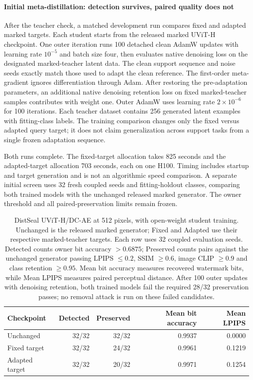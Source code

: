 \paragraph{Initial meta-distillation: detection survives, paired quality does not}
\label{sec:transport_training}
After the teacher check, a matched development run compares fixed and adapted marked targets. Each student starts from the released marked UViT-H checkpoint. One outer iteration runs 100 detached clean AdamW updates with learning rate $10^{-5}$ and batch size four, then evaluates native denoising loss on the designated marked-teacher latent data. The clean support sequence and noise seeds exactly match those used to adapt the clean reference. The first-order meta-gradient ignores differentiation through Adam. After restoring the pre-adaptation parameters, an additional native denoising retention loss on fixed marked-teacher samples contributes with weight one. Outer AdamW uses learning rate $2\times10^{-6}$ for 100 iterations. Each teacher dataset contains 256 generated latent examples with fitting-class labels. The training comparison changes only the fixed versus adapted query target; it does not claim generalization across support tasks from a single frozen adaptation sequence.

Both runs complete. The fixed-target allocation takes 825 seconds and the adapted-target allocation 703 seconds, each on one H100. Timing includes startup and target generation and is not an algorithmic speed comparison. A separate initial screen uses 32 fresh coupled seeds and fitting-holdout classes, comparing both trained models with the unchanged released marked generator. The owner threshold and all paired-preservation limits remain frozen.

\begin{table}[ht]\centering\small
\begin{tabular}{lrrrr}\toprule
Checkpoint & Detected & Preserved & Mean bit accuracy & Mean LPIPS\\\midrule
Unchanged & 32/32 & 32/32 & 0.9937 & 0.0000\\
Fixed target & 32/32 & 24/32 & 0.9961 & 0.1219\\
Adapted target & 32/32 & 20/32 & 0.9971 & 0.1254\\\bottomrule
\end{tabular}
\caption{DistSeal UViT-H/DC-AE at 512 pixels, with open-weight student training. Unchanged is the released marked generator; Fixed and Adapted use their respective marked-teacher targets. Each row uses 32 coupled evaluation seeds. Detected counts owner bit accuracy $>0.6875$; Preserved counts pairs against the unchanged generator passing LPIPS $\leq0.2$, SSIM $\geq0.6$, image CLIP $\geq0.9$ and class retention $\geq0.95$. Mean bit accuracy measures recovered watermark bits, while Mean LPIPS measures paired perceptual distance. After 100 outer updates with denoising retention, both trained models fail the required 28/32 preservation passes; no removal attack is run on these failed candidates.}
\end{table}

